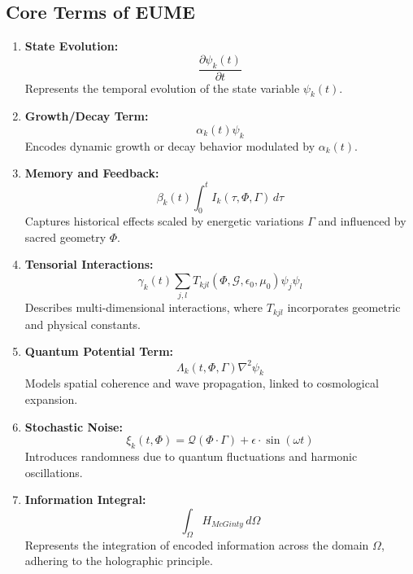 \documentclass{article}
\theoremstyle{plain}
\begin{document}
\subsection{Core Terms of EUME}
\begin{enumerate}
    \item \textbf{State Evolution:}
    \[
    \frac{\partial \psi_k(t)}{\partial t}
    \]
    Represents the temporal evolution of the state variable \(\psi_k(t)\).

    \item \textbf{Growth/Decay Term:}
    \[
    \alpha_k(t)\psi_k
    \]
    Encodes dynamic growth or decay behavior modulated by \(\alpha_k(t)\).

    \item \textbf{Memory and Feedback:}
    \[
    \beta_k(t) \int_0^t I_k(\tau, \Phi, \Gamma) \, d\tau
    \]
    Captures historical effects scaled by energetic variations \(\Gamma\) and influenced by sacred geometry \(\Phi\).

    \item \textbf{Tensorial Interactions:}
    \[
    \gamma_k(t) \sum_{j,l} T_{kjl}(\Phi, \mathcal{G}, \epsilon_0, \mu_0) \psi_j \psi_l
    \]
    Describes multi-dimensional interactions, where \(T_{kjl}\) incorporates geometric and physical constants.

    \item \textbf{Quantum Potential Term:}
    \[
    \Lambda_k(t, \Phi, \Gamma)\nabla^2 \psi_k
    \]
    Models spatial coherence and wave propagation, linked to cosmological expansion.

    \item \textbf{Stochastic Noise:}
    \[
    \xi_k(t, \Phi) = \mathcal{Q}(\Phi \cdot \Gamma) + \epsilon \cdot \sin(\omega t)
    \]
    Introduces randomness due to quantum fluctuations and harmonic oscillations.

    \item \textbf{Information Integral:}
    \[
    \int_{\Omega} H_{McGinty} \, d\Omega
    \]
    Represents the integration of encoded information across the domain \(\Omega\), adhering to the holographic principle.
\end{enumerate}
\end{document}
